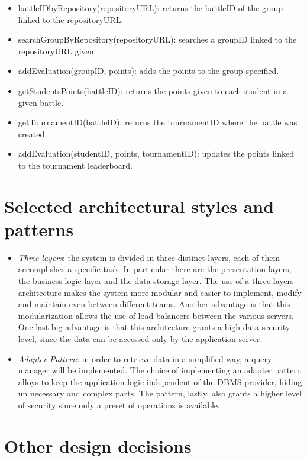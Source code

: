 \documentclass[12pt, a4paper]{report}
\begin{document}
\begin{itemize}
        \item battleIDbyRepository(repositoryURL): returns the battleID of the group linked to the repositoryURL. 
        \item searchGroupByRepository(repositoryURL): searches a groupID linked to the repositoryURL given. 
        \item addEvaluation(groupID, points): adds the points to the group specified. 
        \item getStudentsPoints(battleID): returns the points given to each student in a given battle. 
        \item getTournamentID(battleID): returns the tournamentID where the battle was created. 
        \item addEvaluation(studentID, points, tournamentID): updates the points linked to the tournament leaderboard. 
    \end{itemize}

    \section{Selected architectural styles and patterns}
    \begin{itemize}
        \item \textit{Three layers}: the system is divided in three distinct layers, each of them accomplishes a specific task.
            In particular there are the presentation layers, the business logic layer and the data storage layer.
            The use of a three layers architecture makes the system more modular and easier to implement, modify and maintain even between different teams.
            Another advantage is that this modularization allows the use of load balancers between the various servers.
            One last big advantage is that this architecture grants a high data security level, since the data can be accessed only by the application server.
        \item \textit{Adapter Pattern}: in order to retrieve data in a simplified way, a query manager will be implemented.
            The choice of implementing an adapter pattern alloys to keep the application logic independent of the DBMS provider, hiding un necessary and complex parts. 
            The pattern, lastly, also grants a higher level of security since only a preset of operations is available. 
    \end{itemize}

    \section{Other design decisions}
\end{document}
